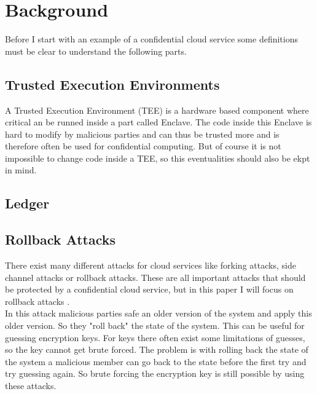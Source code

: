 \section{Background}
Before I start with an example of a confidential cloud service some definitions must be clear to understand the following parts.
\subsection{Trusted Execution Environments}
A Trusted Execution Environment (TEE) is a hardware based component where critical an be runned inside a part called Enclave. The code inside this Enclave is hard to modify by malicious parties and can thus be trusted more and is therefore often be used for confidential computing.  But of course it is not impossible to change code inside a TEE, so this eventualities should also be ekpt in mind.
\subsection{Ledger}
\subsection{Rollback Attacks}
There exist many different attacks for cloud services like forking attacks, side channel attacks or rollback attacks. These are all important attacks that should be protected by a confidential cloud service, but in this paper I will focus on rollback attacks \cite{Rollback}.\\
In this attack malicious parties safe an older version of the system and apply this older version. So they "roll back" the state of the system. This can be useful for guessing encryption keys. For keys there often exist some limitations of guesses, so the key cannot get brute forced. The problem is with rolling back the state of the system a malicious member can go back to the state before the first try and try guessing again. So brute forcing the encryption key is still possible by using these attacks. 